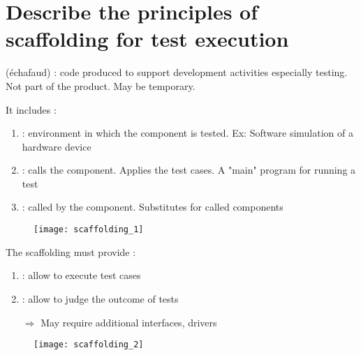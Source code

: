 \section{Describe the principles of scaffolding for test execution}

 (échafaud) : code produced to support development activities especially testing. Not part of the product. May be temporary.

\begin{minipage}{0.74\textwidth}
    It includes :
    \begin{enumerate}
        \item {} : environment in which the component is tested. Ex: Software simulation of a hardware device
        \item {} : calls the component. Applies the test cases. A "main" program for running a test
        \item {} : called by the component. Substitutes for called components
    \end{enumerate}
\end{minipage}
\hfill
\begin{minipage}{0.25\textwidth}
    \begin{figure}[H]
        \centering
        \texttt{[image: scaffolding\_1]}
    \end{figure}
\end{minipage}

\begin{minipage}{0.74\textwidth}
    The scaffolding must provide : 
    \begin{enumerate}
        \item {} : allow to execute test cases
        \item {} : allow to judge the outcome of tests
        \item [$\Rightarrow$] May require additional interfaces, drivers
    \end{enumerate}
\end{minipage}
\hfill
\begin{minipage}{0.25\textwidth}
    \begin{figure}[H]
        \centering
        \texttt{[image: scaffolding\_2]}
    \end{figure}
\end{minipage}

